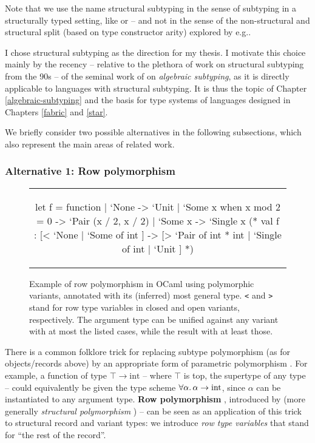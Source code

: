 Note that we use the name structural subtyping in the sense of subtyping in a structurally typed setting, like \textcite{dolan-thesis} or \textcite{cardelli-power-type} -- and not in the sense of the non-structural and structural split (based on type constructor arity) explored by e.g.\@ \textcite{subtyping-decidability}.

I chose structural subtyping as the direction for my thesis. I motivate this choice mainly by the recency -- relative to the plethora of work on structural subtyping from the 90s -- of the seminal work of \textcite{mlsub} on \emph{algebraic subtyping}, as it is directly applicable to languages with structural subtyping. It is thus the topic of Chapter \ref{algebraic-subtyping} and the basis for type systems of languages designed in Chapters \ref{fabric} and \ref{star}.

We briefly consider two possible alternatives in the following subsections, which also represent the main areas of related work.

\subsubsection{Alternative 1: Row polymorphism}

\begin{figure}
    \centering
    \begin{tabular}{c}
    \begin{ocaml}
let f = function 
    | `None -> `Unit 
    | `Some x when x mod 2 = 0 -> `Pair (x / 2, x / 2) 
    | `Some x -> `Single x
(* 
val f : [< `None | `Some of int ] 
     -> [> `Pair of int * int | `Single of int | `Unit ]
*)
    \end{ocaml}
    \end{tabular}
    \caption{Example of row polymorphism in OCaml using polymorphic variants, annotated with its (inferred) most general type. \texttt{<} and \texttt{>} stand for row type variables in closed and open variants, respectively. The argument type can be unified against any variant with at most the listed cases, while the result with at least those.}
    \label{fig:ocaml-row-polymorphism}
\end{figure}

There is a common folklore trick for replacing subtype polymorphism (as for objects/records above) by an appropriate form of parametric polymorphism \cite{structural-subtyping-as-parameric-polymorphism}. For example, a function of type $\top \to \mathrm{int}$ -- where $\top$ is top, the supertype of any type -- could equivalently be given the type scheme $\forall \alpha \ldotp \alpha \to \mathrm{int}$, since $\alpha$ can be instantiated to any argument type.
\textbf{Row polymorphism} \cite{remy-records}, introduced by \textcite{wand-rows} (more generally \emph{structural polymorphism} \cite{simple-structural-polymorphism}) -- can be seen as an application of this trick to structural record and variant types: we introduce \emph{row type variables} that stand for \enquote{the rest of the record}.

